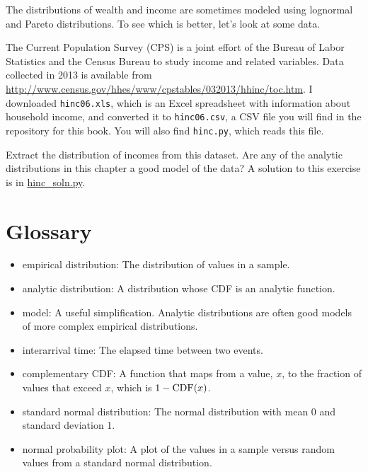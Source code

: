 \documentclass[12pt]{book}
\begin{document}
\begin{exercise}
\label{income}

The distributions of wealth and income are sometimes modeled using
lognormal and Pareto distributions.  To see which is better, let's
look at some data.

The Current Population Survey (CPS) is a joint effort of the Bureau
of Labor Statistics and the Census Bureau to study income and related
variables.  Data collected in 2013 is available from
\url{http://www.census.gov/hhes/www/cpstables/032013/hhinc/toc.htm}.
I downloaded {\tt hinc06.xls}, which is an Excel spreadsheet with
information about household income, and converted it to {\tt hinc06.csv},
a CSV file you will find in the repository for this book.  You
will also find {\tt hinc.py}, which reads this file.

Extract the distribution of incomes from this dataset.  Are any of the
analytic distributions in this chapter a good model of the data?  A
solution to this exercise is in \url{hinc_soln.py}.

\end{exercise}




\section{Glossary}

\begin{itemize}

\item empirical distribution: The distribution of values in a sample.
   

\item analytic distribution: A distribution whose CDF is an analytic
function.

\item model: A useful simplification.  Analytic distributions are
often good models of more complex empirical distributions.

\item interarrival time: The elapsed time between two events.

\item complementary CDF: A function that maps from a value, $x$,
to the fraction of values that exceed $x$, which is $1 - \mathrm{CDF}(x)$.
  

\item standard normal distribution: The normal distribution with
mean 0 and standard deviation 1.

\item normal probability plot: A plot of the values in a sample versus
random values from a standard normal distribution.

\end{itemize}
\end{document}
